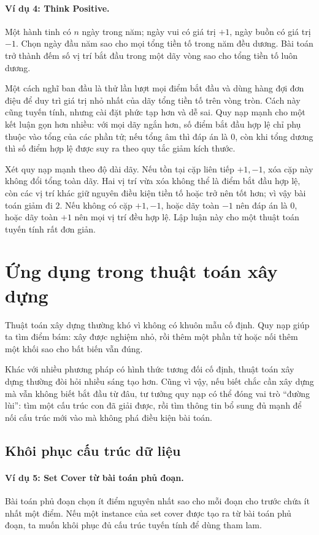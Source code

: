\documentclass[11pt]{article}
\begin{document}
\paragraph{Ví dụ 4: Think Positive.}
Một hành tinh có \(n\) ngày trong năm; ngày vui có giá trị \(+1\), ngày buồn
có giá trị \(-1\). Chọn ngày đầu năm sao cho mọi tổng tiền tố trong năm đều
dương. Bài toán trở thành đếm số vị trí bắt đầu trong một dãy vòng sao cho
tổng tiền tố luôn dương.

Một cách nghĩ ban đầu là thử lần lượt mọi điểm bắt đầu và dùng hàng đợi đơn
điệu để duy trì giá trị nhỏ nhất của dãy tổng tiền tố trên vòng tròn. Cách
này cũng tuyến tính, nhưng cài đặt phức tạp hơn và dễ sai. Quy nạp mạnh cho
một kết luận gọn hơn nhiều: với mọi dãy ngắn hơn, số điểm bắt đầu hợp lệ chỉ
phụ thuộc vào tổng của các phần tử; nếu tổng âm thì đáp án là \(0\), còn khi
tổng dương thì số điểm hợp lệ được suy ra theo quy tắc giảm kích thước.

Xét quy nạp mạnh theo độ dài dãy. Nếu tồn tại cặp liên tiếp \(+1,-1\), xóa
cặp này không đổi tổng toàn dãy. Hai vị trí vừa xóa không thể là điểm bắt đầu
hợp lệ, còn các vị trí khác giữ nguyên điều kiện tiền tố hoặc trở nên tốt hơn;
vì vậy bài toán giảm đi \(2\). Nếu không có cặp \(+1,-1\), hoặc dãy toàn
\(-1\) nên đáp án là \(0\), hoặc dãy toàn \(+1\) nên mọi vị trí đều hợp lệ.
Lập luận này cho một thuật toán tuyến tính rất đơn giản.

\section{Ứng dụng trong thuật toán xây dựng}

Thuật toán xây dựng thường khó vì không có khuôn mẫu cố định. Quy nạp giúp ta
tìm điểm bám: xây được nghiệm nhỏ, rồi thêm một phần tử hoặc nối thêm một
khối sao cho bất biến vẫn đúng.

Khác với nhiều phương pháp có hình thức tương đối cố định, thuật toán xây dựng
thường đòi hỏi nhiều sáng tạo hơn. Cũng vì vậy, nếu biết chắc cần xây dựng mà
vẫn không biết bắt đầu từ đâu, tư tưởng quy nạp có thể đóng vai trò ``đường
lùi'': tìm một cấu trúc con đã giải được, rồi tìm thông tin bổ sung đủ mạnh
để nối cấu trúc mới vào mà không phá điều kiện bài toán.

\subsection{Khôi phục cấu trúc dữ liệu}

\paragraph{Ví dụ 5: Set Cover từ bài toán phủ đoạn.}
Bài toán phủ đoạn chọn ít điểm nguyên nhất sao cho mỗi đoạn cho trước chứa
ít nhất một điểm. Nếu một instance của set cover được tạo ra từ bài toán phủ
đoạn, ta muốn khôi phục đủ cấu trúc tuyến tính để dùng tham lam.
\end{document}
